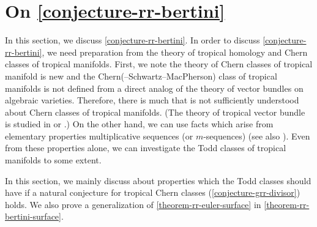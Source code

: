 \documentclass[a4paper,dvipdfmx,reqno,12pt]{amsart}
\theoremstyle{definition}
\numberwithin{equation}{section}
\begin{document}
\section{On \cref{conjecture-rr-bertini}}
\label{section-on-rr-bertini}
In this section, we discuss \cref{conjecture-rr-bertini}.
In order to discuss \cref{conjecture-rr-bertini},
we need preparation from the theory of tropical homology
and Chern classes of tropical manifolds.
First, we note 
the theory of Chern classes of tropical manifold
\cite{demedrano2023chern} is new and 
the Chern(--Schwartz--MacPherson) class of
tropical manifolds is not defined from a direct analog
of the theory of vector bundles on algebraic varieties.
Therefore, there is much that is not sufficiently
understood about Chern classes of tropical manifolds.
(The theory of tropical vector bundle is studied
in \cite{MR2961320,MR4646329} or 
\cite[Theorem 1.8]{amini2020hodge}.)
On the other hand, we can use facts 
which arise from elementary properties
multiplicative sequences (or $m$-sequences)
\cite[]{MR1335917}
(see also \cite[]{MR440554}).
Even from these properties alone,
we can investigate the Todd classes of tropical manifolds
to some extent.

In this section, we mainly
discuss about properties which 
the Todd classes should have if
a natural conjecture for
tropical Chern classes
(\cref{conjecture-grr-divisor}) holds.
We also prove a generalization of 
\cref{theorem-rr-euler-surface}
in \cref{theorem-rr-bertini-surface}.
\end{document}
